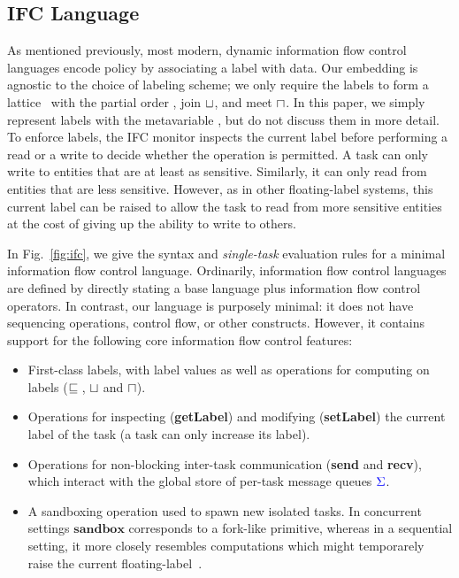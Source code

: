 \documentclass{llncs}
\begin{document}
\subsection{IFC Language}

As mentioned previously, most modern, dynamic information flow control
languages encode policy by associating a label with data.  Our
embedding is agnostic to the choice of labeling scheme; we only require
the labels to form a lattice~\cite{Denning:1976:LMS:360051.360056} with
the partial order , join \ensuremath{\lub}, and meet \ensuremath{\glb}.  In this
paper, we simply represent labels with the metavariable , but do not
discuss them in more detail.
To enforce labels, the IFC monitor inspects the
current label  before performing a read or a write to decide whether the operation is permitted.
A task can only write to entities that are at least as sensitive.
Similarly, it can only read from entities that are less sensitive.
However, as in other floating-label systems, this current label can be raised
to allow the task to read from more sensitive entities at the cost of giving up
the ability to write to others. 

In Fig.~\ref{fig:ifc}, we give the syntax and \emph{single-task}
evaluation rules for a minimal information flow control language.
Ordinarily, information flow control languages are defined by directly
stating a base language plus information flow control operators.  In
contrast, our language is purposely minimal: it does not have sequencing
operations, control flow, or other constructs.  However, it contains
support for the following core information flow control features:

\begin{itemize}
    \item First-class labels, with label values  as well as operations for computing on
labels (\ensuremath{\flows{}}, \ensuremath{\lub} and \ensuremath{\glb}).
    \item Operations for inspecting (\textbf{getLabel}) and modifying
    (\textbf{setLabel}) the current label of the task (a task can only increase its label).
    \item Operations for non-blocking inter-task communication (\textbf{send}
    and \textbf{recv}), which interact with the global store of per-task
    message queues \ensuremath{\ifc{\Sigma}}.
\item A sandboxing operation used to spawn new isolated tasks. In
    concurrent settings \ensuremath{\mathbf{sandbox}} corresponds to a fork-like primitive,
    whereas in a
    sequential setting, it more closely resembles
    computations which might temporarely raise the current
    floating-label~\cite{lio,Hritcu:2013:YIB:2497621.2498098}.

\end{itemize}
\end{document}
